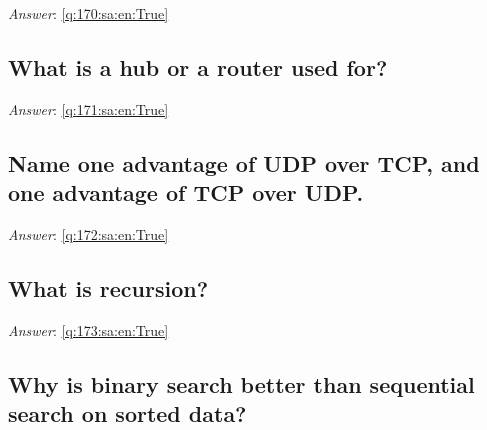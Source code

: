 \documentclass[a4paper,11pt,oneside]{article}
\begin{document}
\begin{sloppypar}
\textit{Answer}: \autoref{q:170:sa:en:True}



\subsection{What is a hub or a router used for?}

\label{q:171:sa:en:False}

\vspace{2cm}

\noindent\makebox[\textwidth]{\hrulefill}

\vspace{1cm}

\textit{Answer}: \autoref{q:171:sa:en:True}



\subsection{Name one advantage of UDP over TCP, and one advantage of TCP over UDP.}

\label{q:172:sa:en:False}

\vspace{2cm}

\noindent\makebox[\textwidth]{\hrulefill}

\vspace{1cm}

\textit{Answer}: \autoref{q:172:sa:en:True}



\subsection{What is recursion?}

\label{q:173:sa:en:False}

\vspace{2cm}

\noindent\makebox[\textwidth]{\hrulefill}

\vspace{1cm}

\textit{Answer}: \autoref{q:173:sa:en:True}



\subsection{Why is binary search better than sequential search on sorted data?}

\label{q:174:sa:en:False}


\end{sloppypar}
\end{document}

